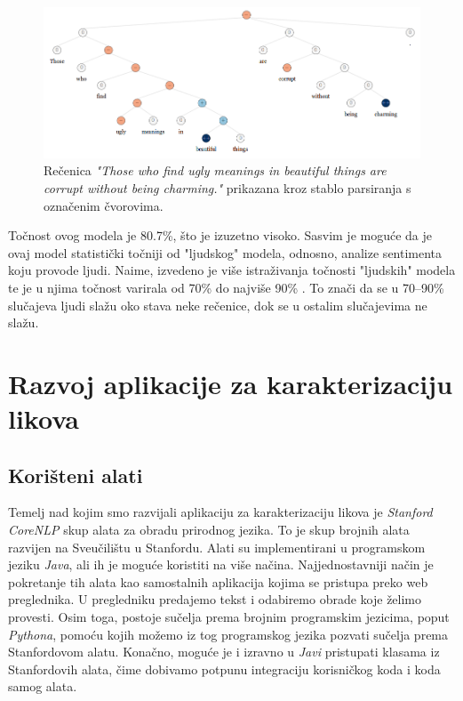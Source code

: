 \documentclass[a4paper,twoside,12pt]{memoir} %
\newcommand{\ti}[1]{\textit{#1\/}}
\begin{document}
	\begin{figure}[H]
		\centering
		\includegraphics[scale = 0.6]{sentiment_treebank.png}
		\caption{Rečenica \ti{"Those who find ugly meanings in beautiful things are corrupt without being charming."} prikazana kroz stablo parsiranja s označenim čvorovima.}
		\label{sentiment_treebank}
	\end{figure}

	Točnost ovog modela je 80.7\%, što je izuzetno visoko. Sasvim je moguće da je ovaj model statistički točniji od "ljudskog" modela, odnosno, analize sentimenta koju provode ljudi. Naime, izvedeno je više istraživanja točnosti "ljudskih" modela te je u njima točnost varirala od 70\% do najviše 90\% \cite{ogneva2010companies, grimes2010expert}. To znači da se u 70--90\% slučajeva ljudi slažu oko stava neke rečenice, dok se u ostalim slučajevima ne slažu.

\chapter{Razvoj aplikacije za karakterizaciju likova}



	\section{Korišteni alati}

		Temelj nad kojim smo razvijali aplikaciju za karakterizaciju likova je \ti{Stanford CoreNLP} skup alata za obradu prirodnog jezika. To je skup brojnih alata razvijen na Sveučilištu u Stanfordu. Alati su implementirani u programskom jeziku \ti{Java}, ali ih je moguće koristiti na više načina. Najjednostavniji način je pokretanje tih alata kao samostalnih aplikacija kojima se pristupa preko web preglednika. U pregledniku predajemo tekst i odabiremo obrade koje želimo provesti. Osim toga, postoje sučelja prema brojnim programskim jezicima, poput \ti{Pythona}, pomoću kojih možemo iz tog programskog jezika pozvati sučelja prema Stanfordovom alatu. Konačno, moguće je i izravno u \ti{Javi} pristupati klasama iz Stanfordovih alata, čime dobivamo potpunu integraciju korisničkog koda i koda samog alata.
\end{document}
